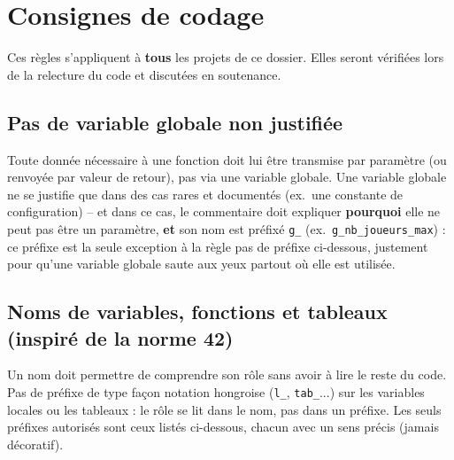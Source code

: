\section{Consignes de codage}

Ces règles s'appliquent à \textbf{tous} les projets de ce dossier. Elles
seront vérifiées lors de la relecture du code et discutées en
soutenance.

\subsection*{Pas de variable globale non justifiée}
Toute donnée nécessaire à une fonction doit lui être transmise par
paramètre (ou renvoyée par valeur de retour), pas via une variable
globale. Une variable globale ne se justifie que dans des cas rares et
documentés (ex.\ une constante de configuration) -- et dans ce cas, le
commentaire doit expliquer \textbf{pourquoi} elle ne peut pas être un
paramètre, \textbf{et} son nom est préfixé \texttt{g\_} (ex.\
\texttt{g\_nb\_joueurs\_max}) : ce préfixe est la seule exception à la
règle \og pas de préfixe \fg{} ci-dessous, justement pour qu'une
variable globale saute aux yeux partout où elle est utilisée.

\subsection*{Noms de variables, fonctions et tableaux (inspiré de la norme 42)}
Un nom doit permettre de comprendre son rôle sans avoir à lire le reste
du code. Pas de préfixe de type façon notation hongroise (\texttt{l\_},
\texttt{tab\_}...) sur les variables locales ou les tableaux : le rôle
se lit dans le nom, pas dans un préfixe. Les seuls préfixes autorisés
sont ceux listés ci-dessous, chacun avec un sens précis (jamais
décoratif).

